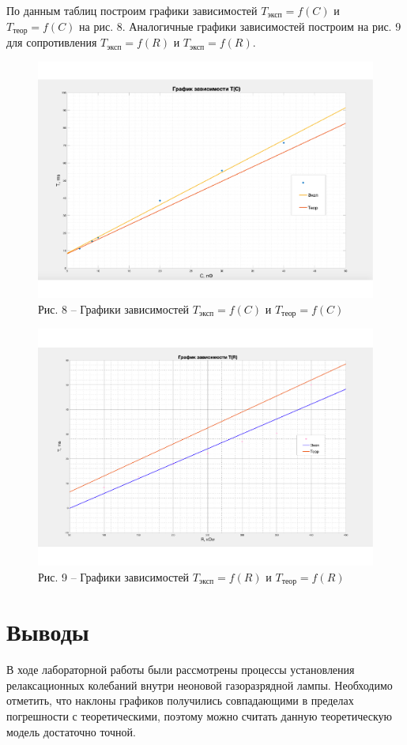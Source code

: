 \documentclass[a4paper,14pt]{article}
\begin{document}
По данным таблиц построим графики зависимостей $T_{\text{эксп}} = f(C)$ и $T_{\text{теор}} = f(C)$ на рис. 8. Аналогичные графики зависимостей построим на рис. 9 для сопротивления $T_{\text{эксп}} = f(R)$ и $T_{\text{эксп}} = f(R)$.

\begin{center}
	\begin{figure}[bhtp]
		\centering
		\includegraphics[width=0.85\linewidth]{gg3.pdf} \\
		Рис. 8 -- Графики зависимостей $T_{\text{эксп}} = f(C)$ и $T_{\text{теор}} = f(C)$
	\end{figure}
\end{center}

\begin{center}
\begin{figure}[bhtp]
	\centering
	\includegraphics[width=\linewidth]{gg4.pdf} \\
	Рис. 9 -- Графики зависимостей $T_{\text{эксп}} = f(R)$ и $T_{\text{теор}} = f(R)$
\end{figure}
\end{center}

\section*{Выводы}
	В ходе лабораторной работы были рассмотрены процессы установления релаксационных колебаний внутри неоновой газоразрядной лампы. Необходимо отметить, что  наклоны графиков получились совпадающими в пределах погрешности с теоретическими, поэтому можно считать данную теоретическую модель достаточно точной.
\end{document}
